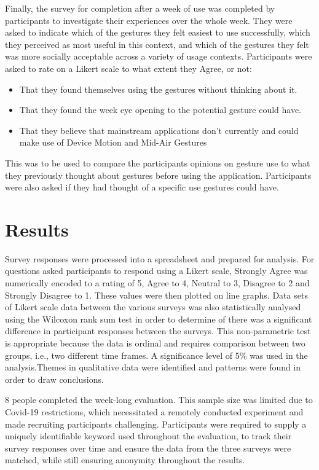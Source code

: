 \documentclass{l4proj}
\begin{document}
Finally, the survey for completion after a week of use was completed by participants to investigate their experiences over the whole week. They were asked to indicate which of the gestures they felt easiest to use successfully, which they perceived as most useful in this context, and which of the gestures they felt was more socially acceptable across a variety of usage contexts. Participants were asked to rate on a Likert scale to what extent they Agree, or not: 
\begin{itemize}
  \item That they found themselves using the gestures without thinking about it.
  \item That they  found the week eye opening to the potential gesture could have.
  \item That they believe that mainstream applications don't currently and could make use of Device Motion and Mid-Air Gestures
\end{itemize}
This was to be used to compare the participants opinions on gesture use to what they previously thought about gestures before using the application. Participants were also asked if they had thought of a specific use gestures could have.


\section{Results} 

Survey responses were processed into a spreadsheet and prepared for analysis. For questions asked participants to respond using a Likert scale, Strongly Agree was numerically encoded to a rating of 5, Agree to 4, Neutral to 3, Disagree to 2 and Strongly Disagree to 1. These values were then plotted on line graphs. Data sets of Likert scale data between the various surveys was also statistically analysed using the Wilcoxon rank sum test in order to determine of there was a significant difference in participant responses between the surveys. This non-parametric test is appropriate because the data is ordinal and requires comparison between two groups, i.e., two different time frames. A significance level of 5\% was used in the analysis.Themes in qualitative data were identified and patterns were found in order to draw conclusions.

8 people completed the week-long evaluation. This sample size was limited due to Covid-19 restrictions, which necessitated a remotely conducted experiment and made recruiting participants challenging. Participants were required to supply a uniquely identifiable keyword used throughout the evaluation, to track their survey responses over time and ensure the data from the three surveys were matched, while still ensuring anonymity throughout the results. 
\end{document}
